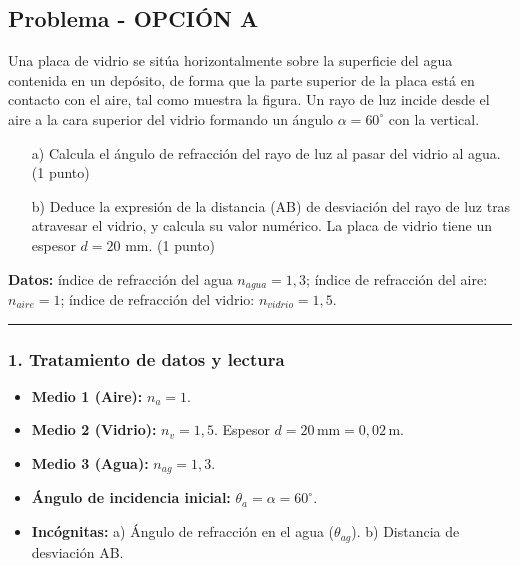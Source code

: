 \subsection{Problema - OPCIÓN A}
\label{subsec:B3A_2017_jun_ord}
\begin{cajaenunciado}
Una placa de vidrio se sitúa horizontalmente sobre la superficie del agua contenida en un depósito, de forma que la parte superior de la placa está en contacto con el aire, tal como muestra la figura. Un rayo de luz incide desde el aire a la cara superior del vidrio formando un ángulo $\alpha=60^{\circ}$ con la vertical.
\begin{enumerate}
    \item[a)] Calcula el ángulo de refracción del rayo de luz al pasar del vidrio al agua. (1 punto)
    \item[b)] Deduce la expresión de la distancia (AB) de desviación del rayo de luz tras atravesar el vidrio, y calcula su valor numérico. La placa de vidrio tiene un espesor $d=20$ mm. (1 punto)
\end{enumerate}
\textbf{Datos:} índice de refracción del agua $n_{agua}=1,3$; índice de refracción del aire: $n_{aire}=1$; índice de refracción del vidrio: $n_{vidrio}=1,5$.
\end{cajaenunciado}
\hrule

\subsubsection*{1. Tratamiento de datos y lectura}
\begin{itemize}
    \item \textbf{Medio 1 (Aire):} $n_a = 1$.
    \item \textbf{Medio 2 (Vidrio):} $n_v = 1,5$. Espesor $d = 20\,\text{mm} = 0,02\,\text{m}$.
    \item \textbf{Medio 3 (Agua):} $n_{ag} = 1,3$.
    \item \textbf{Ángulo de incidencia inicial:} $\theta_a = \alpha = 60^\circ$.
    \item \textbf{Incógnitas:} a) Ángulo de refracción en el agua ($\theta_{ag}$). b) Distancia de desviación AB.
\end{itemize}


